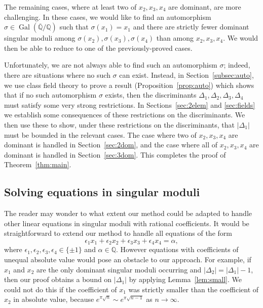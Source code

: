 \documentclass[12pt,a4paper,oneside]{amsart}
\DeclareMathOperator{\gal}{Gal}
\begin{document}
The remaining cases, where at least two of $x_2, x_3, x_4$ are dominant, are more challenging.
In these cases, we would like to find an automorphism $\sigma \in \gal(\overline{\mathbb{Q}} / \mathbb{Q})$ such that $\sigma(x_1) = x_1$ and there are strictly fewer dominant singular moduli among $\sigma(x_2), \sigma(x_3), \sigma(x_4)$ than among $x_2, x_3, x_4$.
We would then be able to reduce to one of the previously-proved cases.

Unfortunately, we are not always able to find such an automorphism $\sigma$; indeed, there are situations where no such $\sigma$ can exist.
Instead, in Section~\ref{subsec:auto}, we use class field theory to prove a result (Proposition~\ref{prop:auto}) which shows that if no such automorphism $\sigma$ exists, then the discriminants $\Delta_1, \Delta_2, \Delta_3, \Delta_4$ must satisfy some very strong restrictions.
In Sections~\ref{sec:2elem} and \ref{sec:fields} we establish some consequences of these restrictions on the discriminants.
 We then use these to show, under these restrictions on the discriminants, that $\lvert \Delta_1 \rvert$ must be bounded in the relevant cases.
The case where two of $x_2, x_3, x_4$ are dominant is handled in Section~\ref{sec:2dom}, and the case where all of $x_2, x_3, x_4$ are dominant is handled in Section~\ref{sec:3dom}.
This completes the proof of Theorem~\ref{thm:main}.

\subsection{Solving equations in singular moduli}
    
  

   The reader may wonder to what extent our method could be adapted to handle other linear equations in singular moduli with rational coefficients.
   It would be straightforward to extend our method to handle all equations of the form
   \[ \epsilon_1 x_1 + \epsilon_2 x_2 + \epsilon_3 x_3 + \epsilon_4 x_4 = \alpha,\]
   where $\epsilon_1, \epsilon_2, \epsilon_3, \epsilon_4 \in \{\pm 1\}$ and $\alpha \in \mathbb{Q}$.
   However equations with coefficients of unequal absolute value would pose an obstacle to our approach.
   For example, if $x_1$ and $x_2$ are the only dominant singular moduli occurring and $\lvert \Delta_2 \lvert = \lvert \Delta_1 \rvert - 1$, then our proof obtains a bound on $\lvert \Delta_1 \rvert$ by applying Lemma~\ref{lem:small}.
We could not do this if the coefficient of $x_1$ was strictly smaller than the coefficient of $x_2$ in absolute value, because $e^{\pi \sqrt{n}} \sim e^{\pi \sqrt{n-1}}$ as $n \to \infty$.
\end{document}
